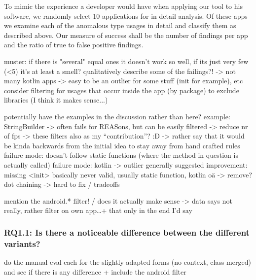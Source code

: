 To mimic the experience a developer would have when applying our tool to his software, we randomly select 10 applications for in detail analysis.
Of these apps we examine each of the anomalous type usages in detail and classify them as described above.
Our measure of success shall be the number of findings per app and the ratio of true to false positive findings.


muster: if there is "several" equal ones it doesn't work so well, if its just very few (<5) it's at least a smell?
qualitatively describe some of the failings?! -> not many kotlin apps -> easy to be an outlier for some stuff (init for example), etc
consider filtering for usages that occur inside the app (by package) to exclude libraries (I think it makes sense...)

potentially have the examples in the discussion rather than here?
example: StringBuilder -> often fails for REASons, but can be easily filtered -> reduce nr of fps
-> these filters also as my ``contribution''? :D -> rather say that it would be kinda backwards from the initial idea to stay away from hand crafted rules
failure mode: doesn't follow static functions (where the method in question is actually called)
failure mode: kotlin -> outlier generally
suggested improvement: missing <init> basically never valid, usually static function, kotlin oä -> remove?
dot chaining -> hard to fix / tradeoffs

mention the android.* filter! / does it actually make sense -> data says not really, rather filter on own app\ldots + that only in the end I'd say

\subsubsection{RQ1.1: Is there a noticeable difference between the different variants?}

do the manual eval each for the slightly adapted forms (no context, class merged) and see if there is any difference
+ include the android filter

